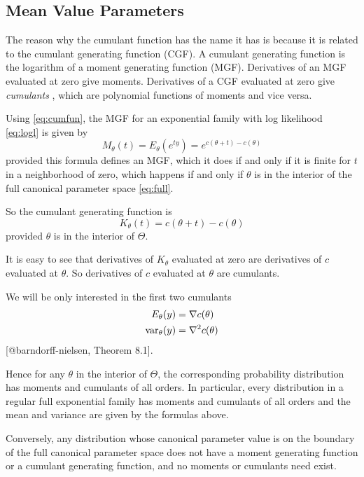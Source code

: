 \documentclass[11pt]{article}
\begin{document}
\subsection{Mean Value Parameters}

The reason why the cumulant function has the name it has is because it
is related to the cumulant generating function (CGF).
A cumulant generating function is the logarithm of a moment generating
function (MGF).
Derivatives of an MGF evaluated at zero give moments.
Derivatives of a CGF evaluated at zero give
\emph{cumulants} \citep{wiki:cumulant}, which
are polynomial functions of moments and vice versa.

Using \eqref{eq:cumfun}, the MGF for an exponential family
with log likelihood \eqref{eq:logl} is given by
$$
   M_\theta(t) = E_\theta(e^{t y}) = e^{c(\theta + t) - c(\theta)}
$$
provided this formula defines an MGF, which it does if and only if it
is finite for $t$ in a neighborhood of zero, which happens if and only if
$\theta$ is in the interior of
the full canonical parameter space \eqref{eq:full}.

So the cumulant generating function is
$$
   K_\theta(t) = c(\theta + t) - c(\theta)
$$
provided $\theta$ is in the interior of $\Theta$.

It is easy to see that derivatives of $K_\theta$ evaluated at zero
are derivatives of $c$ evaluated at $\theta$.
So derivatives of $c$ evaluated at $\theta$ are cumulants.

We will be only interested in the first two cumulants
\begin{align}
   E_\theta(y) & = \nabla c(\theta)
   \label{eq:cumfun-first-derivative}
   \\
   \mathop{\rm var}\nolimits_\theta(y) & = \nabla^2 c(\theta)
   \label{eq:cumfun-second-derivative}
\end{align}
[@barndorff-nielsen, Theorem 8.1].

Hence for any $\theta$ in the interior of $\Theta$, the corresponding
probability distribution has moments and cumulants of all orders.
In particular, every distribution in a regular full exponential family
has moments and cumulants of all orders and the mean and variance are
given by the formulas above.

Conversely, any distribution whose canonical parameter value is on the
boundary of the full canonical parameter space does not have a moment
generating function or a cumulant generating function, and no moments or
cumulants need exist.
\end{document}
